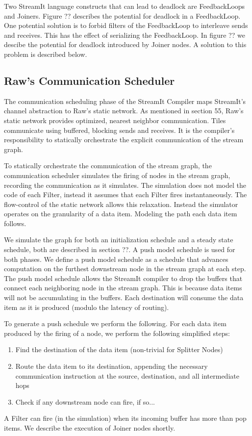 Two StreamIt language constructs that can lead to deadlock are
FeedbackLoops and Joiners. Figure ?? describes the potential for
deadlock in a FeedbackLoop.  One potential solution is to forbid
filters of the FeedbackLoop to interleave sends and receives.  This
has the effect of serializing the FeedbackLoop. In figure ?? we
descibe the potential for deadlock introduced by Joiner nodes.  A
solution to this problem is described below.

\subsection{Raw's Communication Scheduler}

The communication scheduling phase of the StreamIt Compiler maps
StreamIt's channel abstraction to Raw's static network.  As mentioned
in section 55, Raw's static network provides optimized, nearest
neighbor communication.  Tiles communicate using buffered, blocking
sends and receives.  It is the compiler's responsibility to statically
orchestrate the explicit communication of the stream graph.

To statically orchestrate the communication of the stream graph, the
communication scheduler simulates the firing of nodes in the stream
graph, recording the communication as it simulates.  The simulation
does not model the code of each Filter, instead it assumes that each
Filter fires instantaneously.  The flow-control of the static network
allows this relaxation.  Instead the simulator operates on the
granularity of a data item.  Modeling the path each data item follows.

We simulate the graph for both an initialization schedule and a steady
state schedule, both are described in section ??.  A push model
schedule is used for both phases.  We define a push model schedule as
a schedule that advances computation on the furthest downstream node
in the stream graph at each step.  The push model schedule allows the
StreamIt compiler to drop the buffers that connect each neighboring
node in the stream graph.  This is because data items will not be
accumulating in the buffers.  Each destination will consume the data
item as it is produced (modulo the latency of routing).

To generate a push schedule we perform the following.  For each data
item produced by the firing of a node, we perform the following
simplified steps: 
\begin{enumerate}
\item Find the destination of the data item (non-trivial
for Splitter Nodes) 
\item Route the data item to its destination, appending the necessary communication instruction at the source,
destination, and all intermediate hops 
\item Check if any downstream node can fire, if so...  
\end{enumerate}
A Filter can fire (in the simulation) when its
incoming buffer has more than pop items.  We describe the execution of
Joiner nodes shortly.

